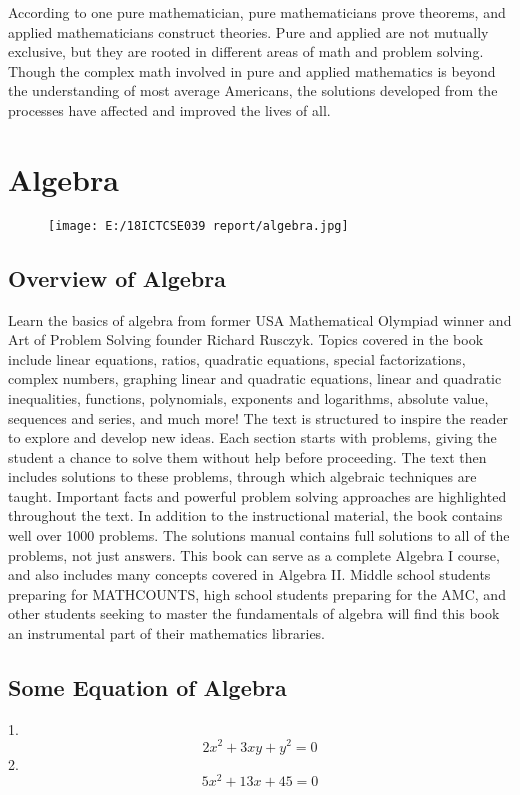 \documentclass{article}
\begin{document}
According to one pure mathematician, pure mathematicians prove theorems, and applied mathematicians construct theories. Pure and applied are not mutually exclusive, but they are rooted in different areas of math and problem solving. Though the complex math involved in pure and applied mathematics is beyond the understanding of most average Americans, the solutions developed from the processes have affected and improved the lives of all.
\newpage
\section{Algebra}
\begin{figure}[H]
\texttt{[image: E:/18ICTCSE039 report/algebra.jpg]}
\end{figure}
\subsection{Overview of Algebra}
Learn the basics of algebra from former USA Mathematical Olympiad winner and Art of Problem Solving founder Richard Rusczyk. Topics covered in the book include linear equations, ratios, quadratic equations, special factorizations, complex numbers, graphing linear and quadratic equations, linear and quadratic inequalities, functions, polynomials, exponents and logarithms, absolute value, sequences and series, and much more!
\newline \newline
The text is structured to inspire the reader to explore and develop new ideas. Each section starts with problems, giving the student a chance to solve them without help before proceeding. The text then includes solutions to these problems, through which algebraic techniques are taught. Important facts and powerful problem solving approaches are highlighted throughout the text. In addition to the instructional material, the book contains well over 1000 problems. The solutions manual contains full solutions to all of the problems, not just answers.
\newline \newline 
This book can serve as a complete Algebra I course, and also includes many concepts covered in Algebra II. Middle school students preparing for MATHCOUNTS, high school students preparing for the AMC, and other students seeking to master the fundamentals of algebra will find this book an instrumental part of their mathematics libraries.
\subsection{Some Equation of Algebra}
1.$$2x^2+3xy+y^2=0$$
2.$$5x^2+13x+45=0$$
\end{document}
